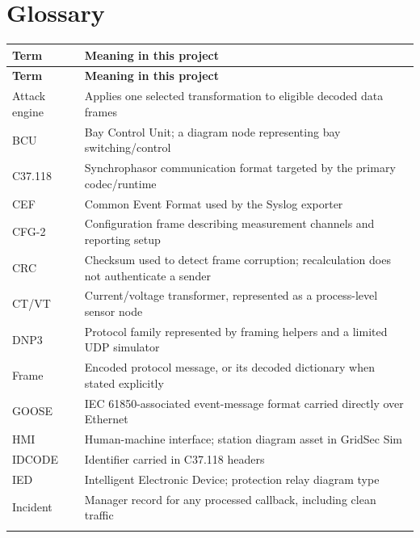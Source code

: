 \chapter{Glossary}\label{chapter-17}
\begingroup
\fontsize{8.7}{11.8}\selectfont
\setlength{\tabcolsep}{5pt}
\renewcommand{\arraystretch}{1.23}
\begin{longtable}{@{}>{\raggedright\arraybackslash}p{}>{\raggedright\arraybackslash}p{}@{}}
\rowcolor{navy} \color{white}\bfseries Term & \color{white}\bfseries Meaning in this project \\
\endfirsthead
\rowcolor{navy} \color{white}\bfseries Term & \color{white}\bfseries Meaning in this project \\
\endhead
\endfoot
\rowcolor{pale}
Attack engine & Applies one selected transformation to eligible decoded data frames \\
BCU & Bay Control Unit; a diagram node representing bay switching/control \\
\rowcolor{pale}
C37.118 & Synchrophasor communication format targeted by the primary codec/runtime \\
CEF & Common Event Format used by the Syslog exporter \\
\rowcolor{pale}
CFG-2 & Configuration frame describing measurement channels and reporting setup \\
CRC & Checksum used to detect frame corruption; recalculation does not authenticate a sender \\
\rowcolor{pale}
CT/VT & Current/voltage transformer, represented as a process-level sensor node \\
DNP3 & Protocol family represented by framing helpers and a limited UDP simulator \\
\rowcolor{pale}
Frame & Encoded protocol message, or its decoded dictionary when stated explicitly \\
GOOSE & IEC 61850-associated event-message format carried directly over Ethernet \\
\rowcolor{pale}
HMI & Human-machine interface; station diagram asset in GridSec Sim \\
IDCODE & Identifier carried in C37.118 headers \\
\rowcolor{pale}
IED & Intelligent Electronic Device; protection relay diagram type \\
Incident & Manager record for any processed callback, including clean traffic \\
\rowcolor{pale}

\end{longtable}

